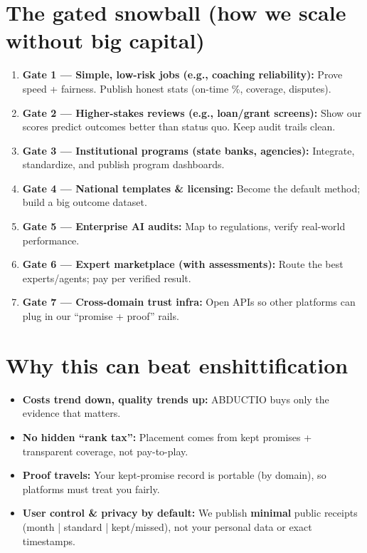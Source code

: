 \documentclass[11pt]{article}
\begin{document}
\section*{The gated snowball (how we scale without big capital)}
\label{sec:orgfea9a4b}
\begin{enumerate}
\item \textbf{\textbf{Gate 1 — Simple, low-risk jobs (e.g., coaching reliability):}}
Prove speed + fairness. Publish honest stats (on-time \%, coverage, disputes).
\item \textbf{\textbf{Gate 2 — Higher-stakes reviews (e.g., loan/grant screens):}}
Show our scores predict outcomes better than status quo. Keep audit trails clean.
\item \textbf{\textbf{Gate 3 — Institutional programs (state banks, agencies):}}
Integrate, standardize, and publish program dashboards.
\item \textbf{\textbf{Gate 4 — National templates \& licensing:}}
Become the default method; build a big outcome dataset.
\item \textbf{\textbf{Gate 5 — Enterprise AI audits:}}
Map to regulations, verify real-world performance.
\item \textbf{\textbf{Gate 6 — Expert marketplace (with assessments):}}
Route the best experts/agents; pay per verified result.
\item \textbf{\textbf{Gate 7 — Cross-domain trust infra:}}
Open APIs so other platforms can plug in our “promise + proof” rails.
\end{enumerate}
\section*{Why this can beat enshittification}
\label{sec:orge52f2c1}
\begin{itemize}
\item \textbf{\textbf{Costs trend down, quality trends up:}} ABDUCTIO buys only the evidence that matters.
\item \textbf{\textbf{No hidden “rank tax”:}} Placement comes from kept promises + transparent coverage, not pay-to-play.
\item \textbf{\textbf{Proof travels:}} Your kept-promise record is portable (by domain), so platforms must treat you fairly.
\item \textbf{\textbf{User control \& privacy by default:}} We publish \textbf{minimal} public receipts (month | standard | kept/missed),
not your personal data or exact timestamps.
\end{itemize}
\end{document}
